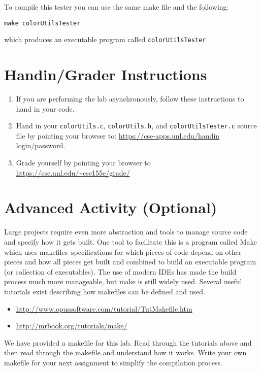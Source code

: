 \documentclass[12pt]{scrartcl}
\begin{document}
To compile this tester you can use the same make file and the
following:

\texttt{make colorUtilsTester}

which produces an executable program called \texttt{colorUtilsTester}


\section{Handin/Grader Instructions}

\begin{enumerate}
  \item If you are performing the lab asynchronously, follow these instructions to hand in your code.
  \item Hand in your \texttt{colorUtils.c}, \texttt{colorUtils.h}, and \texttt{colorUtilsTester.c} source file by pointing your browser to:
  	\url{https://cse-apps.unl.edu/handin}
	login/password.
  \item Grade yourself by pointing your browser to
  	\url{https://cse.unl.edu/~cse155e/grade/}
\end{enumerate}

\section{Advanced Activity (Optional)}

Large projects require even more abstraction and tools to manage 
source code and specify how it gets built.  One tool to facilitate this 
is a program called Make which uses makefiles--specifications for 
which pieces of code depend on other pieces and how all pieces 
get built and combined to build an executable program (or collection 
of executables).  The use of modern IDEs has made the build process 
much more manageable, but make is still widely used.  Several 
useful tutorials exist describing how makefiles can be defined and 
used.
\begin{itemize}
  \item \url{http://www.opussoftware.com/tutorial/TutMakefile.htm}
  \item \url{http://mrbook.org/tutorials/make/}
\end{itemize}
We have provided a makefile for this lab.  Read through the tutorials
above and then read through the makefile and understand how it works.
Write your own makefile for your next assignment to simplify the
compilation process.
\end{document}
